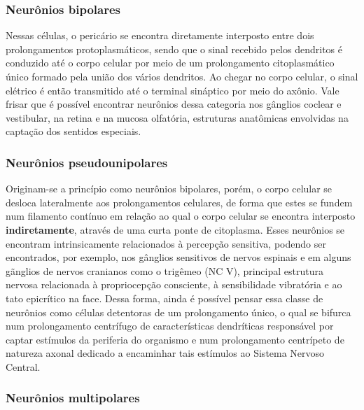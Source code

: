 \documentclass[
]{book}
\begin{document}
\hypertarget{neuruxf4nios-bipolares}{%
\subsubsection*{Neurônios bipolares}\label{neuruxf4nios-bipolares}}

Nessas células, o pericário se encontra diretamente interposto entre dois prolongamentos protoplasmáticos, sendo que o sinal recebido pelos dendritos é conduzido até o corpo celular por meio de um prolongamento citoplasmático único formado pela união dos vários dendritos. Ao chegar no corpo celular, o sinal elétrico é então transmitido até o terminal sináptico por meio do axônio. Vale frisar que é possível encontrar neurônios dessa categoria nos gânglios coclear e vestibular, na retina e na mucosa olfatória, estruturas anatômicas envolvidas na captação dos sentidos especiais.

\hypertarget{neuruxf4nios-pseudounipolares}{%
\subsubsection*{Neurônios pseudounipolares}\label{neuruxf4nios-pseudounipolares}}

Originam-se a princípio como neurônios bipolares, porém, o corpo celular se desloca lateralmente aos prolongamentos celulares, de forma que estes se fundem num filamento contínuo em relação ao qual o corpo celular se encontra interposto \textbf{indiretamente}, através de uma curta ponte de citoplasma. Esses neurônios se encontram intrinsicamente relacionados à percepção sensitiva, podendo ser encontrados, por exemplo, nos gânglios sensitivos de nervos espinais e em alguns gãnglios de nervos cranianos como o trigêmeo (NC V), principal estrutura nervosa relacionada à propriocepção consciente, à sensibilidade vibratória e ao tato epicrítico na face. Dessa forma, ainda é possível pensar essa classe de neurônios como células detentoras de um prolongamento único, o qual se bifurca num prolongamento centrífugo de características dendríticas responsável por captar estímulos da periferia do organismo e num prolongamento centrípeto de natureza axonal dedicado a encaminhar tais estímulos ao Sistema Nervoso Central.

\hypertarget{neuruxf4nios-multipolares}{%
\subsubsection*{Neurônios multipolares}\label{neuruxf4nios-multipolares}}
\end{document}
